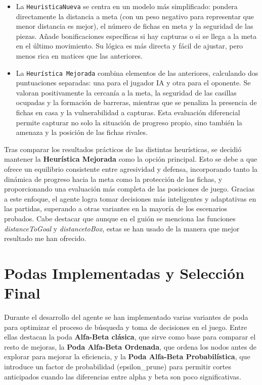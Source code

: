 \begin{itemize}
    \item La \texttt{HeuristicaNueva} se centra en un modelo más simplificado: pondera directamente la distancia a meta (con un peso negativo para representar que menor distancia es mejor), el número de fichas en meta y la seguridad de las piezas. Añade bonificaciones específicas si hay capturas o si se llega a la meta en el último movimiento. Su lógica es más directa y fácil de ajustar, pero menos rica en matices que las anteriores.
    
    \item La \texttt{Heurística Mejorada} combina elementos de las anteriores, calculando dos puntuaciones separadas: una para el jugador IA y otra para el oponente. Se valoran positivamente la cercanía a la meta, la seguridad de las casillas ocupadas y la formación de barreras, mientras que se penaliza la presencia de fichas en casa y la vulnerabilidad a capturas. Esta evaluación diferencial permite capturar no solo la situación de progreso propio, sino también la amenaza y la posición de las fichas rivales.
\end{itemize}


Tras comparar los resultados prácticos de las distintas heurísticas, se decidió mantener la \textbf{Heurística Mejorada} como la opción principal. Esto se debe a que ofrece un equilibrio consistente entre agresividad y defensa, incorporando tanto la dinámica de progreso hacia la meta como la protección de las fichas, y proporcionando una evaluación más completa de las posiciones de juego. Gracias a este enfoque, el agente logra tomar decisiones más inteligentes y adaptativas en las partidas, superando a otras variantes en la mayoría de los escenarios probados. Cabe destacar que aunque en el guión se menciona las funciones \textit{distanceToGoal} y \textit{distancetoBox}, estas se han usado de la manera que mejor resultado me han ofrecido.



    
    
    

\chapter*{Podas Implementadas y Selección Final}

Durante el desarrollo del agente se han implementado varias variantes de poda para optimizar el proceso de búsqueda y toma de decisiones en el juego. Entre ellas destacan la poda \textbf{Alfa-Beta clásica}, que sirve como base para comparar el resto de mejoras, la \textbf{Poda Alfa-Beta Ordenada}, que ordena los nodos antes de explorar para mejorar la eficiencia, y la \textbf{Poda Alfa-Beta Probabilística}, que introduce un factor de probabilidad (epsilon\_prune) para permitir cortes anticipados cuando las diferencias entre alpha y beta son poco significativas.


